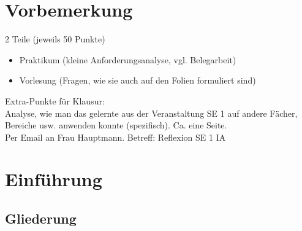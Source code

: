 \newcommand{\customDir}{../}








%



\maketitle
\newpage
\tableofcontents
\newpage
\chapter*{Vorbemerkung}
2 Teile (jeweils 50 Punkte)
\begin{itemize}
\item Praktikum (kleine Anforderungsanalyse, vgl. Belegarbeit)
\item Vorlesung (Fragen, wie sie auch auf den Folien formuliert sind)
\end{itemize}
Extra-Punkte für Klausur:\\
Analyse, wie man das gelernte aus der Veranstaltung SE 1 auf andere Fächer, Bereiche usw. anwenden konnte (spezifisch). Ca. eine Seite.\\
Per Email an Frau Hauptmann. Betreff: Reflexion SE 1 IA

\chapter{Einführung}

\section{Gliederung}

